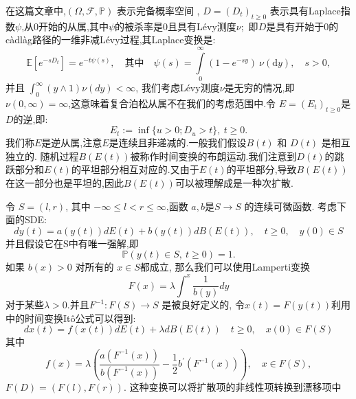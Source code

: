 \documentclass[12pt,final]{article}
\numberwithin{equation}{section}
\numberwithin{figure}{section}
\numberwithin{table}{section}
\theoremstyle{plain}
\theoremstyle{definition}
\theoremstyle{remark}
\begin{document}
在这篇文章中,$(\Omega,\mathcal{F},\mathbb{P})$ 表示完备概率空间 , $D=(D_t)_{t\geq0}$ 表示具有Laplace指数$\psi$,从0开始的从属,其中$\psi$的被杀率是0且具有Lévy测度$\nu;$ 即$D$是具有开始于0的càdlàg路径的一维非减Lévy过程,其Laplace变换是:
$$\mathbb{E}[e^{-sD_t}]=e^{-t\psi(s)},\quad\text{其中}\quad\psi(s)=\int\limits_0^\infty(1-e^{-sy})\:\nu(\text{d}y),\quad s>0,$$
并且 $\int_0^\infty(y\wedge1)\nu(dy) < \infty$,
我们考虑Lévy测度$\nu$是无穷的情况,即$\nu ( 0, \infty ) = \infty$,这意味着复合泊松从属不在我们的考虑范围中.令 $E=(E_t)_{t\geq0}$是$D$的逆,即:
$$E_t:=\inf\{u>0;D_u>t\},\:t\geq0.$$
我们称$E$是逆从属,注意$E$是连续且非递减的.一般我们假设$B(t)$ 和 $D(t)$ 是相互独立的. 随机过程$B(E(t))$被称作时间变换的布朗运动.我们注意到$D(t)$的跳跃部分和$E(t)$的平坦部分相互对应的.又由于$E(t)$的平坦部分,导致$B(E(t))$在这一部分也是平坦的,因此$B(E(t))$可以被理解成是一种次扩散.

令 $S=(l,r)$, 其中 $-\infty\leq l<r\leq\infty$,函数 $a,b$是$S\to S$ 的连续可微函数. 考虑下面的SDE:
$$dy(t)=a(y(t))dE(t)+b(y(t))dB(E(t)),\quad t\geq0,\quad y(0)\in S$$
并且假设它在S中有唯一强解,即
$$\mathbb{P}(y(t)\in S,\:t\geq0)=1.$$
如果 $b(x)>0$ 对所有的 $x\in S$都成立, 那么我们可以使用Lamperti变换
$$F(x)=\lambda\int^x\frac1{b(y)}dy$$
对于某些$\lambda>0.$并且$F^{-1}:F(S)\to S$ 是被良好定义的, 令$x(t)=F(y(t))$利用\cite{umarov2018beyond}中的时间变换Itô公式可以得到:
$$dx(t)=f(x(t))dE(t) + \lambda dB(E(t)) \quad t\geq0,\quad x(0)\in F(S)$$
其中
$$f(x)=\lambda\left(\frac{a(F^{-1}(x))}{b(F^{-1}(x))}-\frac12b^{\prime}(F^{-1}(x))\right),\quad x\in F(S),$$
$F(D)=(F(l),F(r)).$ 这种变换可以将扩散项的非线性项转换到漂移项中
\end{document}
